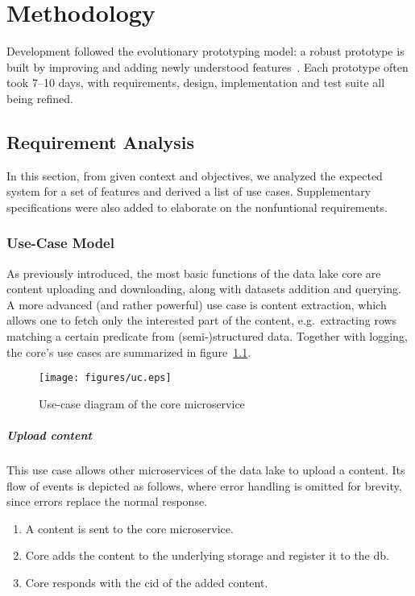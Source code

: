 \chapter{Methodology}
Development followed the evolutionary prototyping model: a robust prototype
is built by improving and adding newly understood features~\cite{proto}.
Each prototype often took 7--10 days, with requirements, design, implementation
and test suite all being refined.

\section{Requirement Analysis}
In this section, from given context and objectives, we analyzed
the expected system for a set of features and derived a list of use cases.
Supplementary specifications were also added to elaborate
on the nonfuntional requirements.

\subsection{Use-Case Model}\label{uc-model}
As previously introduced, the most basic functions of the data lake core
are \gls{content} uploading and downloading, along with datasets addition
and querying.  A more advanced (and rather powerful) use case is
content extraction, which allows one to fetch only the interested part
of the content, e.g.~extracting rows matching a certain \gls{predicate}
from (semi-)structured data.  Together with logging, the core's use cases
are summarized in figure~\ref{uc}.

\begin{figure}\centering
  \texttt{[image: figures/uc.eps]}
  \caption{Use-case diagram of the core microservice}
  \label{uc}
\end{figure}

\paragraph{Upload content}  This use case allows other microservices
of the data lake to upload a \gls{content}.  Its flow of events is depicted
as follows, where error handling is omitted for brevity, since errors
replace the normal response.
\begin{enumerate}
  \item A \gls{content} is sent to the core microservice.
  \item Core adds the content to the underlying storage
    and register it to the \gls{db}.
  \item Core responds with the \gls{cid} of the added \gls{content}.
\end{enumerate}

